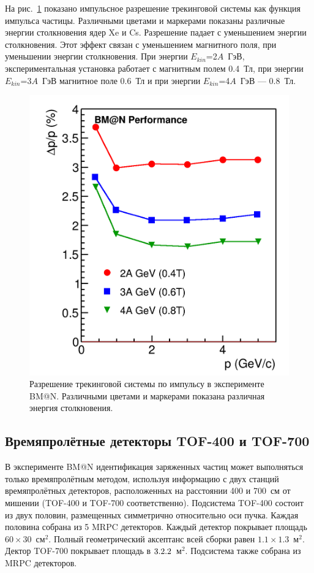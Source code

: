 На рис.~\ref{fig:bmn_mom_res} показано импульсное разрешение трекинговой системы как функция импульса частицы.
Различными цветами и маркерами показаны различные энергии столкновения ядер Xe и Cs.
Разрешение падает с уменьшением энергии столкновения. 
Этот эффект связан с уменьшением магнитного поля, при уменьшении энергии столкновения. 
При энергии $E_{kin}$=2$A$~ГэВ, экспериментальная установка работает с магнитным полем 0.4~Тл, при энергии $E_{kin}$=3$A$~ГэВ магнитное поле 0.6~Тл и при энергии $E_{kin}$=4$A$~ГэВ --- 0.8~Тл.
%
\begin{figure}[ht]
\begin{center}
\includegraphics[width=0.55\linewidth]{images/momentum_resolution.png}
\caption{Разрешение трекинговой системы по импульсу в эксперименте BM@N. Различными цветами и маркерами показана различная энергия столкновения.}
\label{fig:bmn_mom_res}
\end{center}
\end{figure}

\subsection{Времяпролётные детекторы TOF-400 и TOF-700}

В эксперименте BM@N идентификация заряженных частиц может выполняться только времяпролётным методом, используя информацию с двух станций времяпролётных детекторов, расположенных на расстоянии 400 и 700~см от мишении (TOF-400 и TOF-700 соответственно).
Подсистема TOF-400 состоит из двух половин, размещенных симметрично относительно оси пучка.
Каждая половина собрана из 5 MRPC детекторов.
Каждый детектор покрывает площадь $60\times30$~см$^2$.
Полный геометрический аксептанс всей сборки равен $1.1\times1.3$~м$^2$.
Дектор TOF-700 покрывает площадь в $3.2\time2.2$~м$^2$.
Подсистема также собрана из MRPC детекторов.

